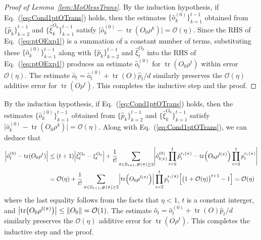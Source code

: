 \documentclass[aps,prl,twocolumn,nofootinbib,superscriptaddress,10pt]{revtex4-2}
\let\originalleft\left
\let\originalright\right
\renewcommand{\left}{\mathopen{}\mathclose\bgroup\originalleft}
\renewcommand{\right}{\aftergroup\egroup\originalright}
\DeclareMathOperator{\Tr}{tr}
\theoremstyle{plain}
\theoremstyle{definition}
\newcommand{\poly}{\mathrm{poly}}
\def\eqref#1{\textup{(\ref{#1})}}
\newcommand{\eref}[1]{Eq.~\textup{(\ref{#1})}}
\newcommand{\lref}[1]{Lemma~\ref{#1}}
\begin{document}
\begin{proof}[Proof of \lref{lem:MoOlessTrans}]
By the induction hypothesis, if \eref{eq:Cond1ptOTrans} holds, then the estimates $\{\hat{o}_k^{(0)}\}_{k=1}^{t-1}$ obtained from $\{\hat{p}_k\}_{k=2}^{t-1}$ and $\{\hat{\xi}_k^{O_0}\}_{k=1}^{t-1}$ satisfy 
$\big| \hat{o}_k^{(0)}-\Tr(O_0\rho^k)\big|= \mathcal{O}(\eta)$. 
Since the RHS of \eref{eq:ptOExp1} is a summation of a constant number of terms, 
substituting these $\{\hat{o}_k^{(0)}\}_{k=1}^{t-1}$ along with $\{\hat{p}_k\}_{k=2}^{t-1}$ and $\hat{\xi}_t^{O_0}$ into the RHS of \eref{eq:ptOExp1} produces an estimate $\hat{o}_t^{(0)}$ for $\Tr(O_0\rho^t)$ within error $\mathcal{O}(\eta)$. The estimate $\hat{o}_t = \hat{o}_t^{(0)} + \Tr(O) \hat{p}_t / d$ similarly preserves the $\mathcal{O}(\eta)$ additive error for $\Tr(O \rho^t)$. 
This completes the inductive step and the proof.
\end{proof}


By the induction hypothesis, if \eref{eq:Cond1ptOTrans} holds, then the estimates $\{\hat{o}_k^{(0)}\}_{k=1}^{t-1}$ obtained from $\{\hat{p}_k\}_{k=2}^{t-1}$ and $\{\hat{\xi}_k^{O_0}\}_{k=1}^{t-1}$ satisfy 
$\big| \hat{o}_k^{(0)}-\Tr(O_0\rho^k)\big|= \mathcal{O}(\eta)$. Along with \eref{eq:Cond1ptOTrans}, we can deduce that
\begin{align}
\left|\hat{o}_t^{(0)} - \Tr(O_0\rho^t) \right| &\le (t+1)\left|\hat{\xi}_t^{O_0}-\xi_t^{O_0}\right| + \frac{1}{t!}\sum_{\pi\in \mathrm{S}_{t+1},\#(\pi)\geq 2} \left|\hat{o}_{l(\pi)}^{(0)} \prod_{i=2}^{t} \hat{p}_i^{r_i(\pi)}-\Tr\left( O_0\rho^{l(\pi)} \right) \prod_{i=2}^{t} p_i^{r_i(\pi)}\right|\nonumber\\
&=\mathcal{O}(\eta) + \frac{1}{t!}\sum_{\pi\in \mathrm{S}_{t+1},\#(\pi)\geq 2}\left|\Tr\left( O_0\rho^{l(\pi)} \right)\right| \prod_{i=2}^{t} p_i^{r_i(\pi)}\left[\big(1+\mathcal{O}(\eta)\big)^{t+1}-1\right]=\mathcal{O}(\eta)
\end{align}
where the last equality follows from the facts that $\eta<1$, $t$ is a constant interger, and $\left|\Tr\left(O_0\rho^{l(\pi)}\right)\right|\leq \|O_0\|=\mathcal{O}(1)$.
The estimate $\hat{o}_t = \hat{o}_t^{(0)} + \Tr(O) \hat{p}_t / d$ similarly preserves the $\mathcal{O}(\eta)$ additive error for $\Tr(O \rho^t)$. 
This completes the inductive step and the proof.
\fi
\end{document}
